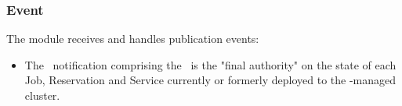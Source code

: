     \subsubsection{Event}
    
      The module receives and handles publication events:
      \begin{itemize}
      \item \varORmap

      The \varOrchestrator~notification comprising the \varORmap~is the
      "final authority" on the state of each Job, Reservation and Service
      currently or formerly deployed to the \varDUCC-managed cluster.
    
      \end{itemize}    
